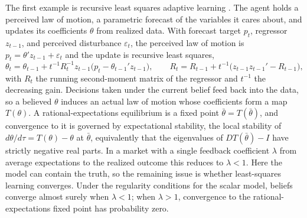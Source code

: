 The first example is recursive least squares adaptive learning \citep{MarcetSargent1989, EvansHonkapohja2001}. The agent holds a perceived law of motion, a parametric forecast of the variables it cares about, and updates its coefficients $\theta$ from realized data. With forecast target $p_t$, regressor $z_{t-1}$, and perceived disturbance $\varepsilon_t$, the perceived law of motion is $p_t = \theta' z_{t-1} + \varepsilon_t$ and the update is recursive least squares,
\[
  \theta_t = \theta_{t-1} + t^{-1} R_t^{-1} z_{t-1}\big(p_t - \theta_{t-1}' z_{t-1}\big), \qquad
  R_t = R_{t-1} + t^{-1}\big(z_{t-1} z_{t-1}' - R_{t-1}\big),
\]
with $R_t$ the running second-moment matrix of the regressor and $t^{-1}$ the decreasing gain. Decisions taken under the current belief feed back into the data, so a believed $\theta$ induces an actual law of motion whose coefficients form a map $T(\theta)$. A rational-expectations equilibrium is a fixed point $\bar\theta = T(\bar\theta)$, and convergence to it is governed by expectational stability, the local stability of $d\theta/d\tau = T(\theta) - \theta$ at $\bar\theta$, equivalently that the eigenvalues of $DT(\bar\theta) - I$ have strictly negative real parts. In a market with a single feedback coefficient $\lambda$ from average expectations to the realized outcome this reduces to $\lambda < 1$. Here the model can contain the truth, so the remaining issue is whether least-squares learning converges. Under the regularity conditions for the scalar model, beliefs converge almost surely when $\lambda < 1$; when $\lambda > 1$, convergence to the rational-expectations fixed point has probability zero.

